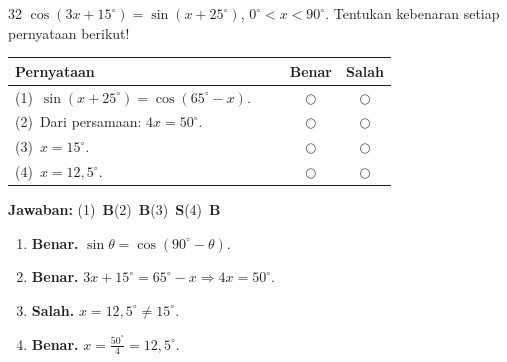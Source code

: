 \documentclass[11pt]{article}
\newcommand{\jawaban}[1]{%
  \noindent\colorbox{gold!30}{\parbox{\dimexpr\linewidth-2\fboxsep\relax}{%
    \textbf{Jawaban:} #1}}\par\smallskip}
\begin{document}
\begin{soal}{32}
$\cos(3x+15^\circ)=\sin(x+25^\circ)$, $0^\circ<x<90^\circ$.
Tentukan kebenaran setiap pernyataan berikut!

\par\smallskip
{\renewcommand{\arraystretch}{1.4}%
\begin{tabular}{@{}p{0.76\linewidth}cc@{}}
\hline\textbf{Pernyataan}&\textbf{Benar}&\textbf{Salah}\\\hline
(1)~$\sin(x+25^\circ)=\cos(65^\circ-x)$.&$\bigcirc$&$\bigcirc$\\
(2)~Dari persamaan: $4x=50^\circ$.&$\bigcirc$&$\bigcirc$\\
(3)~$x=15^\circ$.&$\bigcirc$&$\bigcirc$\\
(4)~$x=12{,}5^\circ$.&$\bigcirc$&$\bigcirc$\\\hline
\end{tabular}}
\end{soal}
\begin{pembox}
\jawaban{(1)~\textbf{B}\quad(2)~\textbf{B}\quad(3)~\textbf{S}\quad(4)~\textbf{B}}
\begin{enumerate}[leftmargin=*,topsep=2pt,itemsep=2pt]
\item \textbf{Benar.} $\sin\theta=\cos(90^\circ-\theta)$.
\item \textbf{Benar.} $3x+15^\circ=65^\circ-x\Rightarrow4x=50^\circ$.
\item \textbf{Salah.} $x=12{,}5^\circ\neq15^\circ$.
\item \textbf{Benar.} $x=\tfrac{50^\circ}{4}=12{,}5^\circ$.
\end{enumerate}
\end{pembox}
\end{document}
